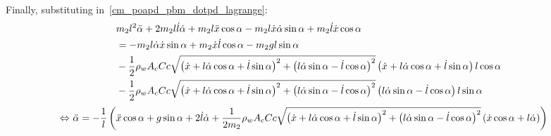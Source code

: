 Finally, substituting in~\cref{cm_poapd_pbm_dotpd_lagrange}:
\begin{align*}
	 & {m}_{2}l^2\ddot{\alpha} + 2{m}_{2}l\dot{l}\dot{\alpha} + {m}_{2}l\ddot{x} \cos{\ensuremath{\alpha}} - {m}_{2}l\dot{x} \dot{\alpha} \sin{\ensuremath{\alpha}} + {m}_{2}\dot{l}\dot{x}\cos{\ensuremath{\alpha}}                                                                                                                 \\
	 & = - {m}_{2}l\dot{\alpha}\dot{x}\sin{\ensuremath{\alpha}} + {m}_{2}\dot{x}\dot{l}\cos{\ensuremath{\alpha}} - {m}_{2}gl\sin{\ensuremath{\alpha}}                                                                                                                                                                                                                               \\
	 & - \frac{1}{2} {\rho}_{w} {A}_{c} C{c} \sqrt{\left(\dot{x} + l \dot{\alpha}\cos{\ensuremath{\alpha}} + \dot{l}\sin{\ensuremath{\alpha}}\right)^2 + \left(l \dot{\alpha}\sin{\ensuremath{\alpha}}-\dot{l} \cos{\ensuremath{\alpha}}\right)^2}\left(\dot{x} + l \dot{\alpha}\cos{\ensuremath{\alpha}} + \dot{l}\sin{\ensuremath{\alpha}}\right) l\cos{\ensuremath{\alpha}} \\
	 & - \frac{1}{2} {\rho}_{w} {A}_{c} C{c} \sqrt{\left(\dot{x} + l \dot{\alpha}\cos{\ensuremath{\alpha}} + \dot{l}\sin{\ensuremath{\alpha}}\right)^2 + \left(l \dot{\alpha}\sin{\ensuremath{\alpha}}-\dot{l} \cos{\ensuremath{\alpha}}\right)^2}\left(l \dot{\alpha}\sin{\ensuremath{\alpha}} -\dot{l} \cos{\ensuremath{\alpha}}\right) l\sin{\ensuremath{\alpha}}
\end{align*}
\begin{align}
	\Leftrightarrow~ & \ddot{\alpha} = -\frac{1}{l}\left( \ddot{x} \cos{\ensuremath{\alpha}} + g\sin{\ensuremath{\alpha}} + 2\dot{l}\dot{\alpha} + \frac{1}{2{m}_{2}} {\rho}_{w} {A}_{c} C{c} \sqrt{\left(\dot{x} + l \dot{\alpha}\cos{\ensuremath{\alpha}} + \dot{l}\sin{\ensuremath{\alpha}}\right)^2 + \left(l \dot{\alpha}\sin{\ensuremath{\alpha}}-\dot{l} \cos{\ensuremath{\alpha}}\right)^2}\left(\dot{x}\cos{\ensuremath{\alpha}} + l\dot{\alpha}\right)\right)
\end{align}

